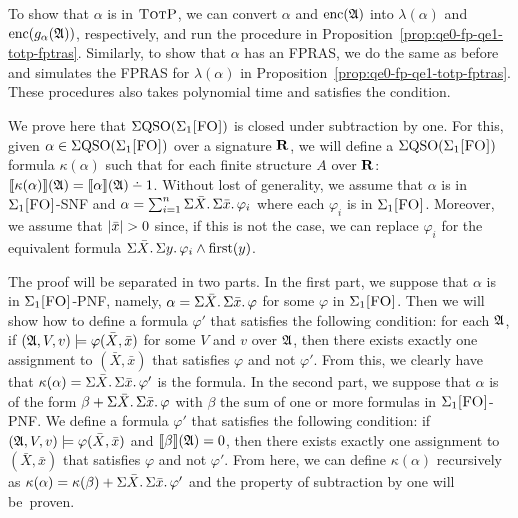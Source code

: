 To show that $\alpha$ is in $\text{\sc TotP}$, we can convert $\alpha$ and ${\rm enc}(\mathfrak{A})$ into $\lambda(\alpha)$ and ${\rm enc}(g_{\alpha}(\mathfrak{A}))$, respectively, and run the procedure in Proposition~\ref{prop:qe0-fp-qe1-totp-fptras}. Similarly, to show that $\alpha$ has an FPRAS, we do the same as before and simulates the FPRAS for $\lambda(\alpha)$ in Proposition~\ref{prop:qe0-fp-qe1-totp-fptras}. These procedures also takes polynomial time and satisfies the condition.

\vspace{1em}
 We prove here that $\Sigma{\rm QSO}(\Sigma_{1}\textsc{[FO]})$ is closed under subtraction by one. 
For this, given $\alpha \in \Sigma{\rm QSO}(\Sigma_{1}\textsc{[FO]})$ over a signature $\mathbf{R}$, we will define a $\Sigma{\rm QSO}(\Sigma_{1}\textsc{[FO]})$ formula $\kappa(\alpha)$ such that for each finite structure $A$ over $\mathbf{R}$: $\sem{\kappa(\alpha)}(\A) = \sem{\alpha}(\A) \dotminus 1$. 
Without lost of generality, we assume that $\alpha$ is in $\Sigma_{1}\textsc{[FO]}$-SNF and $\alpha = \sum_{i = 1}^{n}\Sigma{\bar{X}}.\,\Sigma{\bar{x}}.\,\varphi_i$ where each $\varphi_i$ is in $\Sigma_{1}\textsc{[FO]}$. Moreover, we assume that $\vert \bar{x} \vert > 0$  since, if this is not the case, we can replace $\varphi_i$ for the equivalent formula $\Sigma{\bar{X}}.\, \Sigma{y}.\, \varphi_i \wedge\operatorname{first}(y)$.

The proof will be separated in two parts. In the first part, we suppose that  $\alpha$ is in $\Sigma_{1}\textsc{[FO]}$-PNF, namely, $\alpha = \Sigma{\bar{X}}.\,\Sigma{\bar{x}}.\,\varphi$ for some $\varphi$ in $\Sigma_{1}\textsc{[FO]}$. Then we will show how to define a formula $\varphi'$ that satisfies the following condition: for each $\mathfrak{A}$, if $(\mathfrak{A},V,v)\models \varphi(\bar{X},\bar{x})$ for some $V$ and $v$ over $\mathfrak{A}$, then there exists exactly one assignment to $(\bar{X},\bar{x})$ that satisfies $\varphi$ and not $\varphi'$. 
From this, we clearly have that $\kappa(\alpha) = \Sigma{\bar{X}}.\,\Sigma{\bar{x}}.\,\varphi'$ is the formula. In the second part, we suppose that $\alpha$ is of the form $\beta + \Sigma{\bar{X}}.\,\Sigma{\bar{x}}.\,\varphi$ with $\beta$ the sum of one or more formulas in $\Sigma_{1}\textsc{[FO]}$-PNF. 
We define a formula $\varphi'$ that satisfies the following condition: if $(\mathfrak{A},V,v)\models \varphi(\bar{X},\bar{x})$ and ${\llbracket{}{\beta}\rrbracket}(\mathfrak{A}) = 0$, then there exists exactly one assignment to $(\bar{X},\bar{x})$ that satisfies $\varphi$ and not $\varphi'$. From here, we can define $\kappa(\alpha)$ recursively as  $\kappa(\alpha) = \kappa(\beta) +  \Sigma{\bar{X}}.\,\Sigma{\bar{x}}.\,\varphi'$ and the property of subtraction by one will be~proven.

\vspace{1em}

